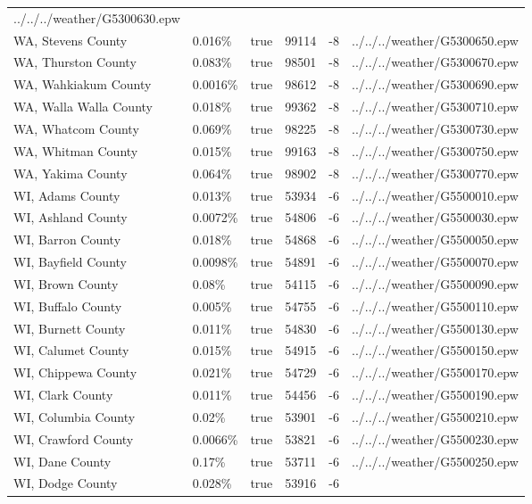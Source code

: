 \begin{longtable}[]{@{}llllll@{}}
../../../weather/G5300630.epw \\
WA, Stevens County & 0.016\% & true & 99114 & -8 &
../../../weather/G5300650.epw \\
WA, Thurston County & 0.083\% & true & 98501 & -8 &
../../../weather/G5300670.epw \\
WA, Wahkiakum County & 0.0016\% & true & 98612 & -8 &
../../../weather/G5300690.epw \\
WA, Walla Walla County & 0.018\% & true & 99362 & -8 &
../../../weather/G5300710.epw \\
WA, Whatcom County & 0.069\% & true & 98225 & -8 &
../../../weather/G5300730.epw \\
WA, Whitman County & 0.015\% & true & 99163 & -8 &
../../../weather/G5300750.epw \\
WA, Yakima County & 0.064\% & true & 98902 & -8 &
../../../weather/G5300770.epw \\
WI, Adams County & 0.013\% & true & 53934 & -6 &
../../../weather/G5500010.epw \\
WI, Ashland County & 0.0072\% & true & 54806 & -6 &
../../../weather/G5500030.epw \\
WI, Barron County & 0.018\% & true & 54868 & -6 &
../../../weather/G5500050.epw \\
WI, Bayfield County & 0.0098\% & true & 54891 & -6 &
../../../weather/G5500070.epw \\
WI, Brown County & 0.08\% & true & 54115 & -6 &
../../../weather/G5500090.epw \\
WI, Buffalo County & 0.005\% & true & 54755 & -6 &
../../../weather/G5500110.epw \\
WI, Burnett County & 0.011\% & true & 54830 & -6 &
../../../weather/G5500130.epw \\
WI, Calumet County & 0.015\% & true & 54915 & -6 &
../../../weather/G5500150.epw \\
WI, Chippewa County & 0.021\% & true & 54729 & -6 &
../../../weather/G5500170.epw \\
WI, Clark County & 0.011\% & true & 54456 & -6 &
../../../weather/G5500190.epw \\
WI, Columbia County & 0.02\% & true & 53901 & -6 &
../../../weather/G5500210.epw \\
WI, Crawford County & 0.0066\% & true & 53821 & -6 &
../../../weather/G5500230.epw \\
WI, Dane County & 0.17\% & true & 53711 & -6 &
../../../weather/G5500250.epw \\
WI, Dodge County & 0.028\% & true & 53916 & -6 &

\end{longtable}
